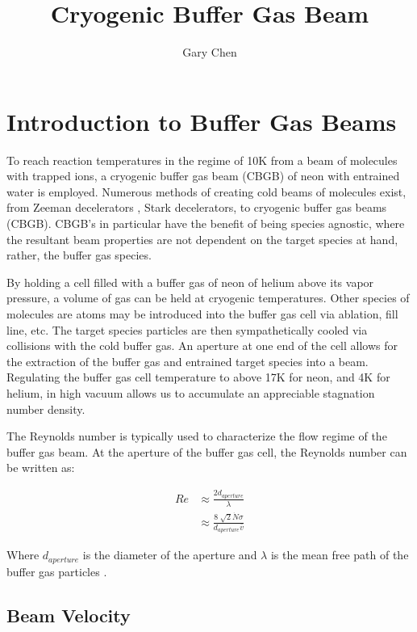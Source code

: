 \documentclass[a4paper]{article}
\title{Cryogenic Buffer Gas Beam}
\author{Gary Chen}
\begin{document}
\maketitle

\section{Introduction to Buffer Gas Beams}

To reach reaction temperatures in the regime of 10K from a beam of molecules with trapped ions, a cryogenic buffer gas beam (CBGB) of neon with entrained water is employed. Numerous methods of creating cold beams of molecules exist, from Zeeman decelerators \cite{Narevicius2008}, Stark decelerators, to cryogenic buffer gas beams (CBGB). CBGB's in particular have the benefit of being species agnostic, where the resultant beam properties are not dependent on the target species at hand, rather, the buffer gas species. 

By holding a cell filled with a buffer gas of neon of helium above its vapor pressure, a volume of gas can be held at cryogenic temperatures. Other species of molecules are atoms may be introduced into the buffer gas cell via ablation, fill line, etc. The target species particles are then sympathetically cooled via collisions with the cold buffer gas. An aperture at one end of the cell allows for the extraction of the buffer gas and entrained target species into a beam. Regulating the buffer gas cell temperature to above 17K for neon, and 4K for helium, in high vacuum allows us to accumulate an appreciable stagnation number density.

The Reynolds number is typically used to characterize the flow regime of the buffer gas beam. At the aperture of the buffer gas cell, the Reynolds number can be written as:

\begin{align} \label{e: reynolds}
Re & \approx \frac{2 d_{aperture}}{\lambda} \\
& \approx \frac{8\sqrt[]{2} \dot{N} \sigma}{d_{aperture} \bar{v}}
\end{align}

Where $d_{aperture}$ is the diameter of the aperture and $\lambda$ is the mean free path of the buffer gas particles \cite{Hutzler2012}.

\subsection{Beam Velocity}
\end{document}
